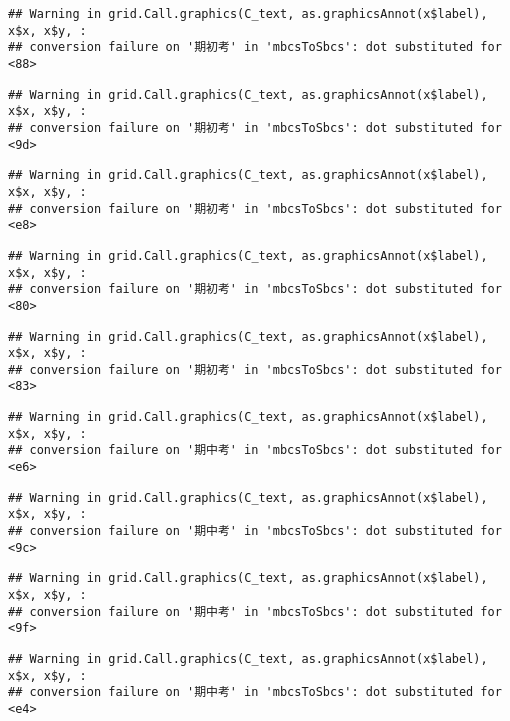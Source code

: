 \documentclass[
]{book}
\begin{document}
\begin{verbatim}
## Warning in grid.Call.graphics(C_text, as.graphicsAnnot(x$label), x$x, x$y, :
## conversion failure on '期初考' in 'mbcsToSbcs': dot substituted for <88>
\end{verbatim}

\begin{verbatim}
## Warning in grid.Call.graphics(C_text, as.graphicsAnnot(x$label), x$x, x$y, :
## conversion failure on '期初考' in 'mbcsToSbcs': dot substituted for <9d>
\end{verbatim}

\begin{verbatim}
## Warning in grid.Call.graphics(C_text, as.graphicsAnnot(x$label), x$x, x$y, :
## conversion failure on '期初考' in 'mbcsToSbcs': dot substituted for <e8>
\end{verbatim}

\begin{verbatim}
## Warning in grid.Call.graphics(C_text, as.graphicsAnnot(x$label), x$x, x$y, :
## conversion failure on '期初考' in 'mbcsToSbcs': dot substituted for <80>
\end{verbatim}

\begin{verbatim}
## Warning in grid.Call.graphics(C_text, as.graphicsAnnot(x$label), x$x, x$y, :
## conversion failure on '期初考' in 'mbcsToSbcs': dot substituted for <83>
\end{verbatim}

\begin{verbatim}
## Warning in grid.Call.graphics(C_text, as.graphicsAnnot(x$label), x$x, x$y, :
## conversion failure on '期中考' in 'mbcsToSbcs': dot substituted for <e6>
\end{verbatim}

\begin{verbatim}
## Warning in grid.Call.graphics(C_text, as.graphicsAnnot(x$label), x$x, x$y, :
## conversion failure on '期中考' in 'mbcsToSbcs': dot substituted for <9c>
\end{verbatim}

\begin{verbatim}
## Warning in grid.Call.graphics(C_text, as.graphicsAnnot(x$label), x$x, x$y, :
## conversion failure on '期中考' in 'mbcsToSbcs': dot substituted for <9f>
\end{verbatim}

\begin{verbatim}
## Warning in grid.Call.graphics(C_text, as.graphicsAnnot(x$label), x$x, x$y, :
## conversion failure on '期中考' in 'mbcsToSbcs': dot substituted for <e4>
\end{verbatim}
\end{document}
